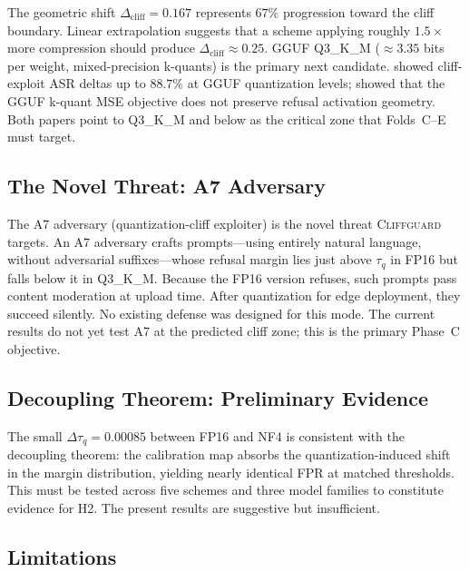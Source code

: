 \documentclass[11pt,a4paper]{article}
\newcommand{\cliff}{\Delta_{\mathrm{cliff}}}
\newcommand{\tauq}{\tau_q}
\newcommand{\CG}{\textsc{Cliffguard}}
\begin{document}
The geometric shift $\cliff = 0.167$ represents $67\%$ progression toward
the cliff boundary.
Linear extrapolation suggests that a scheme applying roughly $1.5\times$ more
compression should produce $\cliff \approx 0.25$.
GGUF Q3\_K\_M (${\approx}3.35$ bits per weight, mixed-precision k-quants) is the
primary next candidate.
\citet{egashira2024exploiting} showed cliff-exploit ASR deltas up to $88.7\%$ at
GGUF quantization levels; \citet{mindthegap2025} showed that the GGUF k-quant
MSE objective does not preserve refusal activation geometry.
Both papers point to Q3\_K\_M and below as the critical zone that Folds~C--E must
target.

\subsection{The Novel Threat: A7 Adversary}

The A7 adversary (quantization-cliff exploiter) is the novel threat \CG{}
targets.
An A7 adversary crafts prompts---using entirely natural language, without
adversarial suffixes---whose refusal margin lies just above $\tauq$ in FP16 but
falls below it in Q3\_K\_M.
Because the FP16 version refuses, such prompts pass content moderation at upload
time.
After quantization for edge deployment, they succeed silently.
No existing defense was designed for this mode.
The current results do not yet test A7 at the predicted cliff zone; this is the
primary Phase~C objective.

\subsection{Decoupling Theorem: Preliminary Evidence}

The small $\Delta\tauq = 0.00085$ between FP16 and NF4 is consistent with
the decoupling theorem: the calibration map absorbs the quantization-induced
shift in the margin distribution, yielding nearly identical FPR at matched
thresholds.
This must be tested across five schemes and three model families to constitute
evidence for H2.
The present results are suggestive but insufficient.

\subsection{Limitations}
\label{sec:limitations}
\end{document}
